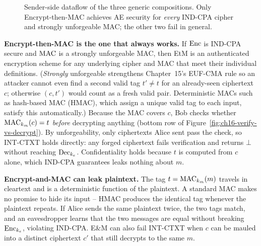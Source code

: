 \begin{figure}[htbp]
\caption{Sender-side dataflow of the three generic compositions. Only Encrypt-then-MAC achieves AE security for \emph{every} IND-CPA cipher and strongly unforgeable MAC; the other two fail in general.}
\label{ch16:composition-fig}
\end{figure}

\textbf{Encrypt-then-MAC is the one that always works.} If $\operatorname{Enc}$ is IND-CPA secure and $\operatorname{MAC}$ is a strongly unforgeable MAC, then EtM is an authenticated encryption scheme for any underlying cipher and MAC that meet their individual definitions. (\emph{Strongly} unforgeable strengthens Chapter~15's EUF-CMA rule so an attacker cannot even find a second valid tag $t' \ne t$ for an already-seen ciphertext $c$; otherwise $(c, t')$ would count as a fresh valid pair. Deterministic MACs such as hash-based MAC (HMAC), which assign a unique valid tag to each input, satisfy this automatically.) Because the MAC covers $c$, Bob checks whether $\operatorname{MAC}_{k_m}(c) = t$ \emph{before} decrypting anything (bottom row of Figure~\ref{fig:ch16-verify-vs-decrypt}). By unforgeability, only ciphertexts Alice sent pass the check, so INT-CTXT holds directly: any forged ciphertext fails verification and returns $\bot$ without reaching $\operatorname{Dec}_{k_e}$. Confidentiality holds because $t$ is computed from $c$ alone, which IND-CPA guarantees leaks nothing about $m$.

\textbf{Encrypt-and-MAC can leak plaintext.} The tag $t = \operatorname{MAC}_{k_m}(m)$ travels in cleartext and is a deterministic function of the plaintext. A standard MAC makes no promise to hide its input -- HMAC produces the identical tag whenever the plaintext repeats. If Alice sends the same plaintext twice, the two tags match, and an eavesdropper learns that the two messages are equal without breaking $\operatorname{Enc}_{k_e}$, violating IND-CPA. E\&M can also fail INT-CTXT when $c$ can be mauled into a distinct ciphertext $c'$ that still decrypts to the same $m$.

